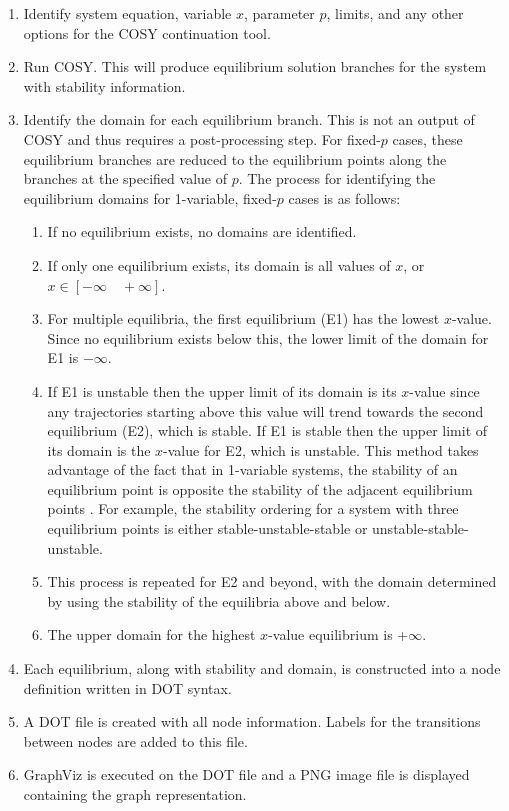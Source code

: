 \documentclass[12pt]{article}
\begin{document}
\begin{enumerate}
\item Identify system equation, variable $x$, parameter $p$, limits, and any other options for the COSY continuation tool.
\item Run COSY. This will produce equilibrium solution branches for the system with stability information.
\item Identify the domain for each equilibrium branch. This is not an output of COSY and thus requires a post-processing step. For fixed-$p$ cases, these equilibrium branches are reduced to the equilibrium points along the branches at the specified value of $p$. The process for identifying the equilibrium domains for 1-variable, fixed-$p$ cases is as follows:
	\begin{enumerate}
	\item If no equilibrium exists, no domains are identified.
	\item If only one equilibrium exists, its domain is all values of $x$, or $x\in [-\infty \quad +\infty]$.
	\item For multiple equilibria, the first equilibrium (E1) has the lowest $x$-value. Since no equilibrium exists below this, the lower limit of the domain for E1 is $-\infty$. 
	\item If E1 is unstable then the upper limit of its domain is its $x$-value since any trajectories starting above this value will trend towards the second equilibrium (E2), which is stable. If E1 is stable then the upper limit of its domain is the $x$-value for E2, which is unstable. This method takes advantage of the fact that in 1-variable systems, the stability of an equilibrium point is opposite the stability of the adjacent equilibrium points \cite{Strogatz}. For example, the stability ordering for a system with three equilibrium points is either stable-unstable-stable or unstable-stable-unstable.
	\item This process is repeated for E2 and beyond, with the domain determined by using the stability of the equilibria above and below. 
	\item The upper domain for the highest $x$-value equilibrium is +$\infty$.
	\end{enumerate}
\item Each equilibrium, along with stability and domain, is constructed into a node definition written in DOT syntax. 
\item A DOT file is created with all node information. Labels for the transitions between nodes are added to this file.
\item GraphViz is executed on the DOT file and a PNG image file is displayed containing the graph representation.
\end{enumerate}
\end{document}
